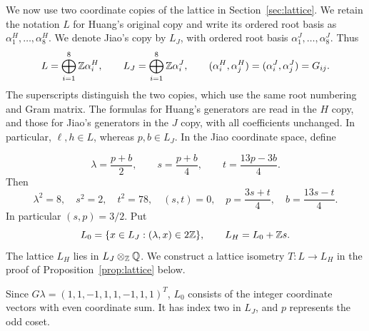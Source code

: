 \documentclass[11pt,reqno]{amsart}
\theoremstyle{definition}\newtheorem{definition}[theorem]{Definition}
\theoremstyle{remark}\newtheorem{remark}[theorem]{Remark}
\numberwithin{equation}{section}
\begin{document}
\begingroup
We now use two coordinate copies of the lattice in Section~\ref{sec:lattice}. We retain the notation $L$ for Huang's original copy and write its ordered root basis as $\alpha_1^H,\ldots,\alpha_8^H$. We denote Jiao's copy by $L_J$, with ordered root basis $\alpha_1^J,\ldots,\alpha_8^J$. Thus
\[
 L=\bigoplus_{i=1}^8\mathbb Z\alpha_i^H,\qquad
 L_J=\bigoplus_{i=1}^8\mathbb Z\alpha_i^J,\qquad
 (\alpha_i^H,\alpha_j^H)=(\alpha_i^J,\alpha_j^J)=G_{ij}.
\]
The superscripts distinguish the two copies, which use the same root numbering and Gram matrix. The formulas for Huang's generators are read in the $H$ copy, and those for Jiao's generators in the $J$ copy, with all coefficients unchanged. In particular, $\ell,h\in L$, whereas $p,b\in L_J$. In the Jiao coordinate space, define
\par\endgroup
\begin{equation}\label{eq:neighborcharges}
 \lambda=\frac{p+b}{2},\qquad s=\frac{p+b}{4},\qquad t=\frac{13p-3b}{4}.
\end{equation}
Then
\begin{equation}\label{eq:norms}
 \lambda^2=8,\quad s^2=2,\quad t^2=78,\quad(s,t)=0,
 \quad p=\frac{3s+t}{4},\quad b=\frac{13s-t}{4}.
\end{equation}
In particular $(s,p)=3/2$. Put
\begin{equation}
 L_0=\{x\in L_J:(\lambda,x)\in2\mathbb Z\},\qquad L_H=L_0+\mathbb Z s.
\end{equation}
\begingroup
The lattice $L_H$ lies in $L_J\otimes_{\mathbb Z}\mathbb Q$. We construct a lattice isometry $T:L\longrightarrow L_H$ in the proof of Proposition~\ref{prop:lattice} below.
\par\endgroup
Since $G\lambda=(1,1,-1,1,1,-1,1,1)^T$, $L_0$ consists of the integer coordinate vectors with even coordinate sum. It has index two in $L_J$, and $p$ represents the odd coset.
\end{document}
